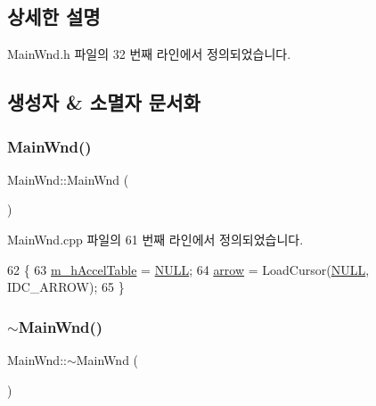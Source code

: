 \subsection{상세한 설명}


Main\+Wnd.\+h 파일의 32 번째 라인에서 정의되었습니다.



\subsection{생성자 \& 소멸자 문서화}
\mbox{\label{class_main_wnd_a2d94400e58869223b5a2797114577981}} 
\subsubsection{\texorpdfstring{Main\+Wnd()}{MainWnd()}}
{\footnotesize\ttfamily Main\+Wnd\+::\+Main\+Wnd (\begin{DoxyParamCaption}{ }\end{DoxyParamCaption})}



Main\+Wnd.\+cpp 파일의 61 번째 라인에서 정의되었습니다.


\begin{DoxyCode}
62 \{
63   \mbox{\hyperlink{class_main_wnd_adde0f53e1d63ef457254bfb346e48152}{m\_hAccelTable}} = \mbox{\hyperlink{getopt1_8c_a070d2ce7b6bb7e5c05602aa8c308d0c4}{NULL}};
64   \mbox{\hyperlink{class_main_wnd_aacb2a400730b1e95ee16792acd6a089f}{arrow}} = LoadCursor(\mbox{\hyperlink{getopt1_8c_a070d2ce7b6bb7e5c05602aa8c308d0c4}{NULL}}, IDC\_ARROW);
65 \}
\end{DoxyCode}
\mbox{\label{class_main_wnd_a9b43d1266651ee4d6e8b97cd4f9aba98}} 
\subsubsection{\texorpdfstring{$\sim$\+Main\+Wnd()}{~MainWnd()}}
{\footnotesize\ttfamily Main\+Wnd\+::$\sim$\+Main\+Wnd (\begin{DoxyParamCaption}{ }\end{DoxyParamCaption})\hspace{0.3cm}{\ttfamily [virtual]}}



